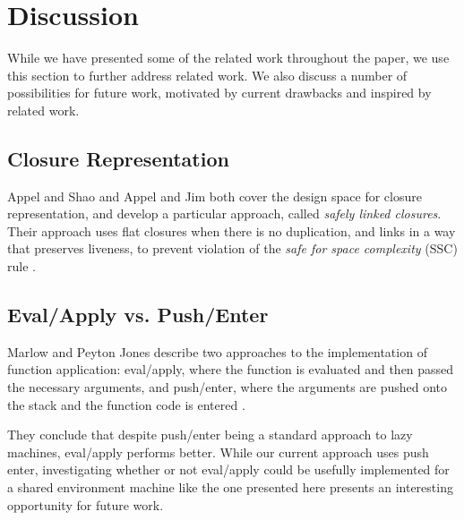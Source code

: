 \section{Discussion} \label{sec:disc}

While we have presented some of the related work throughout the paper, we use
this section to further address related work. We also discuss a number of
possibilities for future work, motivated by current drawbacks and inspired by
related work. 

\subsection{Closure Representation}

Appel and Shao \cite{shao1994space} and Appel and Jim \cite{appel1988optimizing}
both cover the design space for closure representation, and develop a particular
approach, called \emph{safely linked closures}. Their approach uses flat
closures when there is no duplication, and links in a way that preserves
liveness, to prevent violation of the \emph{safe for space complexity} (SSC)
rule \cite{appel2006compiling}.

\subsection{Eval/Apply vs. Push/Enter}

Marlow and Peyton Jones describe two approaches to the implementation of
function application: eval/apply, where the function is evaluated and then
passed the necessary arguments, and push/enter, where the arguments are pushed
onto the stack and the function code is entered \cite{marlow2006making}.

They conclude that despite push/enter being a standard approach to lazy
machines, eval/apply performs better. While our current approach uses push
enter, investigating whether or not eval/apply could be usefully implemented for
a shared environment machine like the one presented here presents an interesting
opportunity for future work.

